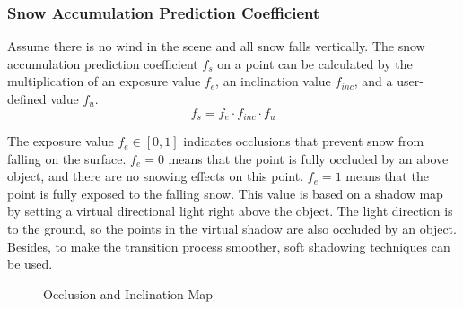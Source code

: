 \documentclass{article}
\begin{document}
\subsubsection {Snow Accumulation Prediction Coefficient}
Assume there is no wind in the scene and all snow falls vertically. The snow accumulation prediction coefficient \( f_{s} \) on a 
point can be calculated by the multiplication of an exposure value \( f_{e} \), an inclination value \( f_{inc} \), and a user-defined 
value \( f_{u} \).
\[
  f_{s} = f_{e} \cdot f_{inc} \cdot f_{u}
\]

The exposure value \( f_{e} \in [0, 1] \) indicates occlusions that prevent snow from falling on the surface. \( f_{e}=0 \) means that 
the point is fully occluded by an above object, and there are no snowing effects on this point. \( f_{e}=1 \) means that the point is 
fully exposed to the falling snow. This value is based on a shadow map by setting a virtual directional light right above the object. 
The light direction is to the ground, so the points in the virtual shadow are also occluded by an object. Besides, to make the 
transition process smoother, soft shadowing techniques can be used. 

\begin{figure}[h]
  \centering
  \caption{Occlusion and Inclination Map}
  \label{fig:Maps}
\end{figure}
\end{document}
